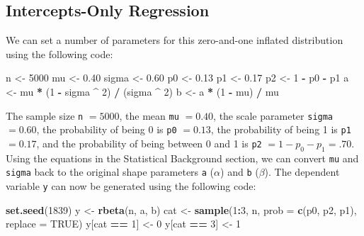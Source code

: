 \documentclass[english,man]{apa6}
\newenvironment{Shaded}{\begin{snugshade}}{\end{snugshade}}
\newcommand{\KeywordTok}[1]{\textcolor[rgb]{0.13,0.29,0.53}{\textbf{#1}}}
\newcommand{\DataTypeTok}[1]{\textcolor[rgb]{0.13,0.29,0.53}{#1}}
\newcommand{\DecValTok}[1]{\textcolor[rgb]{0.00,0.00,0.81}{#1}}
\newcommand{\FloatTok}[1]{\textcolor[rgb]{0.00,0.00,0.81}{#1}}
\newcommand{\StringTok}[1]{\textcolor[rgb]{0.31,0.60,0.02}{#1}}
\newcommand{\OtherTok}[1]{\textcolor[rgb]{0.56,0.35,0.01}{#1}}
\newcommand{\OperatorTok}[1]{\textcolor[rgb]{0.81,0.36,0.00}{\textbf{#1}}}
\newcommand{\NormalTok}[1]{#1}
\theoremstyle{definition}
\theoremstyle{definition}
\theoremstyle{remark}
\begin{document}
\subsection{Intercepts-Only
Regression}\label{intercepts-only-regression}

We can set a number of parameters for this zero-and-one inflated
distribution using the following code:

\begin{Shaded}
\begin{Highlighting}[]
\NormalTok{n <-}\StringTok{ }\DecValTok{5000}
\NormalTok{mu <-}\StringTok{ }\FloatTok{0.40}
\NormalTok{sigma <-}\StringTok{ }\FloatTok{0.60}
\NormalTok{p0 <-}\StringTok{ }\FloatTok{0.13}
\NormalTok{p1 <-}\StringTok{ }\FloatTok{0.17}
\NormalTok{p2 <-}\StringTok{ }\DecValTok{1} \OperatorTok{-}\StringTok{ }\NormalTok{p0 }\OperatorTok{-}\StringTok{ }\NormalTok{p1}
\NormalTok{a <-}\StringTok{ }\NormalTok{mu }\OperatorTok{*}\StringTok{ }\NormalTok{(}\DecValTok{1} \OperatorTok{-}\StringTok{ }\NormalTok{sigma }\OperatorTok{^}\StringTok{ }\DecValTok{2}\NormalTok{) }\OperatorTok{/}\StringTok{ }\NormalTok{(sigma }\OperatorTok{^}\StringTok{ }\DecValTok{2}\NormalTok{)}
\NormalTok{b <-}\StringTok{ }\NormalTok{a }\OperatorTok{*}\StringTok{ }\NormalTok{(}\DecValTok{1} \OperatorTok{-}\StringTok{ }\NormalTok{mu) }\OperatorTok{/}\StringTok{ }\NormalTok{mu}
\end{Highlighting}
\end{Shaded}

The sample size \texttt{n} \(= 5000\), the mean \texttt{mu} \(= 0.40\),
the scale parameter \texttt{sigma} \(= 0.60\), the probability of being
0 is \texttt{p0} \(= 0.13\), the probability of being 1 is \texttt{p1}
\(= 0.17\), and the probability of being between 0 and 1 is \texttt{p2}
\(= 1 - p_0 - p_1 = .70\). Using the equations in the Statistical
Background section, we can convert \texttt{mu} and \texttt{sigma} back
to the original shape parameters \texttt{a} (\(\alpha\)) and \texttt{b}
(\(\beta\)). The dependent variable \texttt{y} can now be generated
using the following code:

\begin{Shaded}
\begin{Highlighting}[]
\KeywordTok{set.seed}\NormalTok{(}\DecValTok{1839}\NormalTok{)}
\NormalTok{y <-}\StringTok{ }\KeywordTok{rbeta}\NormalTok{(n, a, b)}
\NormalTok{cat <-}\StringTok{ }\KeywordTok{sample}\NormalTok{(}\DecValTok{1}\OperatorTok{:}\DecValTok{3}\NormalTok{, n, }\DataTypeTok{prob =} \KeywordTok{c}\NormalTok{(p0, p2, p1), }\DataTypeTok{replace =} \OtherTok{TRUE}\NormalTok{)}
\NormalTok{y[cat }\OperatorTok{==}\StringTok{ }\DecValTok{1}\NormalTok{] <-}\StringTok{ }\DecValTok{0}
\NormalTok{y[cat }\OperatorTok{==}\StringTok{ }\DecValTok{3}\NormalTok{] <-}\StringTok{ }\DecValTok{1}
\end{Highlighting}
\end{Shaded}
\end{document}
